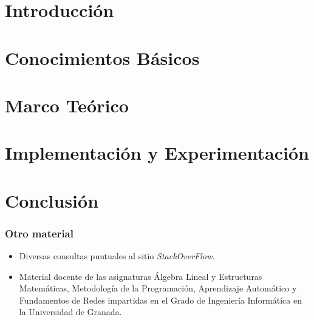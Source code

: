 \documentclass[a4paper,11pt]{book}
\begin{document}


\frontmatter
\tableofcontents
\listoffigures
\listoftables
\mainmatter

\part{Introducción}


\part{Conocimientos Básicos}

%



\part{Marco Teórico}


\part{Implementación y Experimentación}
%
%

\part{Conclusión}
%
%
%
%
%
%


\section*{Otro material}
\begin{itemize}
  \item Diversas consultas puntuales al sitio \emph{StackOverFlow}.
  \item Material docente de las asignaturas Álgebra Lineal y Estructuras Matemáticas, Metodología de la Programación, Aprendizaje Automático y Fundamentos de Redes impartidas en el Grado de Ingeniería Informática en la Universidad de Granada.
\end{itemize}

\label{vernam-ref}


\appendix
%
%
\chapter*{}
\thispagestyle{empty}
\end{document}
